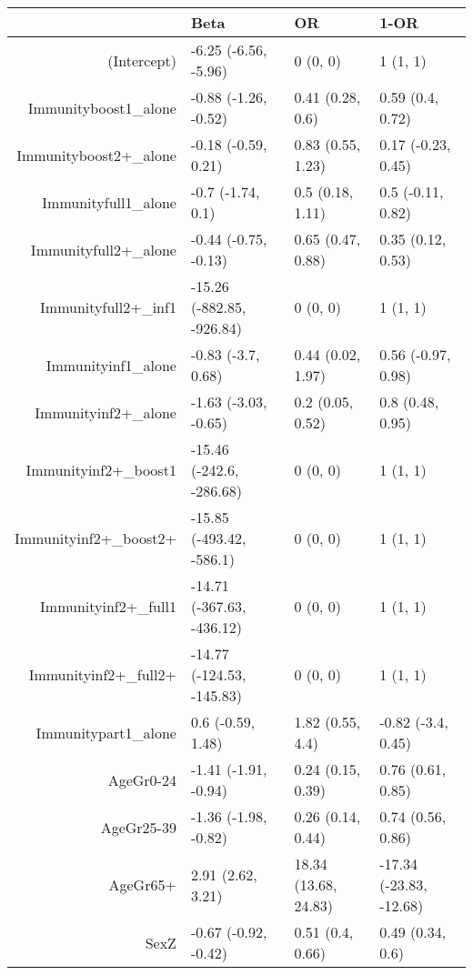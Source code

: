 \begin{table}[ht]
\centering
\begin{tabular}{rlll}
  \hline
 & Beta & OR & 1-OR \\ 
  \hline
(Intercept) & -6.25 (-6.56, -5.96) & 0 (0, 0) & 1 (1, 1) \\ 
  Immunityboost1\_alone & -0.88 (-1.26, -0.52) & 0.41 (0.28, 0.6) & 0.59 (0.4, 0.72) \\ 
  Immunityboost2+\_alone & -0.18 (-0.59, 0.21) & 0.83 (0.55, 1.23) & 0.17 (-0.23, 0.45) \\ 
  Immunityfull1\_alone & -0.7 (-1.74, 0.1) & 0.5 (0.18, 1.11) & 0.5 (-0.11, 0.82) \\ 
  Immunityfull2+\_alone & -0.44 (-0.75, -0.13) & 0.65 (0.47, 0.88) & 0.35 (0.12, 0.53) \\ 
  Immunityfull2+\_inf1 & -15.26 (-882.85, -926.84) & 0 (0, 0) & 1 (1, 1) \\ 
  Immunityinf1\_alone & -0.83 (-3.7, 0.68) & 0.44 (0.02, 1.97) & 0.56 (-0.97, 0.98) \\ 
  Immunityinf2+\_alone & -1.63 (-3.03, -0.65) & 0.2 (0.05, 0.52) & 0.8 (0.48, 0.95) \\ 
  Immunityinf2+\_boost1 & -15.46 (-242.6, -286.68) & 0 (0, 0) & 1 (1, 1) \\ 
  Immunityinf2+\_boost2+ & -15.85 (-493.42, -586.1) & 0 (0, 0) & 1 (1, 1) \\ 
  Immunityinf2+\_full1 & -14.71 (-367.63, -436.12) & 0 (0, 0) & 1 (1, 1) \\ 
  Immunityinf2+\_full2+ & -14.77 (-124.53, -145.83) & 0 (0, 0) & 1 (1, 1) \\ 
  Immunitypart1\_alone & 0.6 (-0.59, 1.48) & 1.82 (0.55, 4.4) & -0.82 (-3.4, 0.45) \\ 
  AgeGr0-24 & -1.41 (-1.91, -0.94) & 0.24 (0.15, 0.39) & 0.76 (0.61, 0.85) \\ 
  AgeGr25-39 & -1.36 (-1.98, -0.82) & 0.26 (0.14, 0.44) & 0.74 (0.56, 0.86) \\ 
  AgeGr65+ & 2.91 (2.62, 3.21) & 18.34 (13.68, 24.83) & -17.34 (-23.83, -12.68) \\ 
  SexZ & -0.67 (-0.92, -0.42) & 0.51 (0.4, 0.66) & 0.49 (0.34, 0.6) \\ 
   \hline
\end{tabular}
\end{table}
